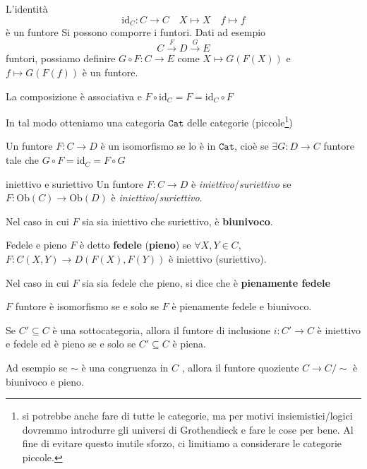     L'identità
    \[
      \mathrm{id}_C : C \to C \quad X \mapsto X \quad f \mapsto f
    \]
    è un funtore
    Si possono comporre i funtori. Dati ad esempio 
    \[
      C \overset{F}{\to } D \overset{G}{\to } E
    \]
    funtori, possiamo definire \(G \circ F : C \to E\) come \(X \mapsto G{(F{(X)})}\)  e \(f \mapsto G{(F{(f)})}\) è un funtore.

    La composizione è associativa  e \(F \circ \mathrm{id}_C = F = \mathrm{id}_C \circ F\) 

In tal modo otteniamo una categoria \(\mathtt{Cat}\) delle categorie (piccole\footnote{si potrebbe anche fare di tutte le categorie, ma per motivi
insiemistici/logici dovremmo introdurre gli universi di Grothendieck e fare le
cose per bene. Al fine di evitare questo inutile sforzo, ci limitiamo a
considerare le categorie piccole.})

\begin{definition}{}
    Un funtore \(F : C \to D\) è un isomorfismo se lo è in \(\mathtt{Cat}\),
    cioè se \(\exists G : D \to C\)  funtore tale che \(G \circ F = \mathrm{id}_C = F \circ G\) 
\end{definition}

\begin{definition}{iniettivo e suriettivo}
    Un funtore \(F : C \to D\) è \emph{iniettivo}/\emph{suriettivo} se \(F : \mathrm{Ob}{(C)} \to \mathrm{Ob}{(D)}\) è \emph{iniettivo}/\emph{suriettivo}.

    Nel caso in cui \(F\) sia sia iniettivo che suriettivo, è \textbf{biunivoco}.
\end{definition}

\begin{definition}{Fedele e pieno}
    \(F\) è detto \textbf{fedele} (\textbf{pieno}) se \(\forall X, Y \in C\), \(F : C{(X, Y)} \to D{(F{(X)}, F{(Y)})}\) è iniettivo (suriettivo).

    Nel caso in cui \(F\) sia sia fedele che pieno, si dice che è
    \textbf{pienamente fedele}
\end{definition}
\begin{eser}{}
    \(F\) funtore è isomorfismo se e solo se \(F\) è pienamente fedele e
    biunivoco.
\end{eser}


\begin{example}{}
    Se \(C' \subseteq C \) è una sottocategoria, allora il funtore di inclusione
    \(i : C' \to C\) è iniettivo e fedele ed è pieno se e solo se \(C' \subseteq C\) è piena.

    Ad esempio se \(\sim \) è una congruenza in \(C\) , allora il funtore
    quoziente \(C \to C / \sim \) è biunivoco e pieno.
\end{example}


